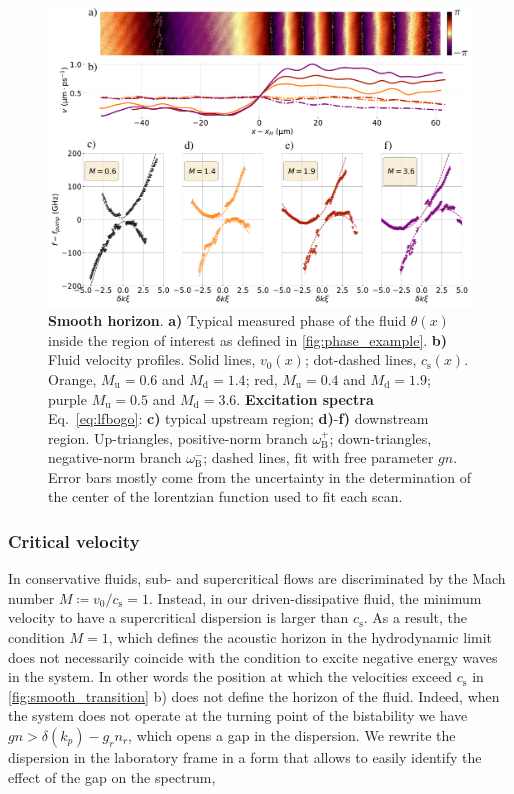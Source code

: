 \begin{figure}
    \centering
    \includegraphics[width=1\textwidth]{chap_custom_st/fig/bh_smooth.pdf}
    \caption{\textbf{Smooth horizon}.
    \textbf{a)} Typical measured phase of the fluid $\theta(x)$ inside the region of interest as defined in \autoref{fig:phase_example}.
    \textbf{b)} Fluid velocity profiles.
    Solid lines, $v_0(x)$; dot-dashed lines, $c_\mathrm{s}(x)$. Orange, $M_\mathrm{u}=0.6$ and $M_\mathrm{d}=1.4$; red, $M_\mathrm{u}=0.4$ and $M_\mathrm{d}=1.9$; purple $M_\mathrm{u}=0.5$ and $M_\mathrm{d}=3.6$.
    \textbf{Excitation spectra} Eq.~\eqref{eq:lfbogo}: \textbf{c)} typical upstream region; \textbf{d)}-\textbf{f)} downstream region.
    Up-triangles, positive-norm branch $\omega_\mathrm{B}^+$; down-triangles, negative-norm branch $\omega_\mathrm{B}^-$; dashed lines, fit with free parameter $gn$. Error bars mostly come from the uncertainty in the determination
    of the center of the lorentzian function used to fit each scan.
    \label{fig:smooth_transition}}
\end{figure}




\subsubsection{Critical velocity} In conservative fluids, sub- and supercritical flows are discriminated by the Mach number $M\coloneqq v_0/c_\mathrm{s}=1$.
Instead, in our driven-dissipative fluid, the minimum velocity to have a supercritical dispersion is larger than $c_\mathrm{s}$.
As a result, the condition $M=1$, which defines the acoustic horizon in the hydrodynamic limit does not necessarily coincide with the condition to excite negative energy waves in the system. In other words the position at 
which the velocities exceed $c_\mathrm{s}$ in \autoref{fig:smooth_transition} b) does not define the horizon of the fluid. Indeed, when the system does not operate at the turning
point of the bistability we have $gn>\delta(k_p)-g_rn_r$, which opens a gap in the dispersion. We rewrite the dispersion in the laboratory frame in a form that allows to easily identify the effect of the gap on the spectrum,


